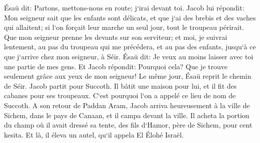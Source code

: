 \verse Ésaü dit: Partons, mettons-nous en route; j`irai devant toi. 
\verse Jacob lui répondit: Mon seigneur sait que les enfants sont délicats, et que j`ai des brebis et des vaches qui allaitent; si l`on forçait leur marche un seul jour, tout le troupeau périrait. 
\verse Que mon seigneur prenne les devants sur son serviteur; et moi, je suivrai lentement, au pas du troupeau qui me précédera, et au pas des enfants, jusqu`à ce que j`arrive chez mon seigneur, à Séir. 
\verse Ésaü dit: Je veux au moins laisser avec toi une partie de mes gens. Et Jacob répondit: Pourquoi cela? Que je trouve seulement grâce aux yeux de mon seigneur! 
\verse Le même jour, Ésaü reprit le chemin de Séir. 
\verse Jacob partit pour Succoth. Il bâtit une maison pour lui, et il fit des cabanes pour ses troupeaux. C`est pourquoi l`on a appelé ce lieu de nom de Succoth. 
\verse A son retour de Paddan Aram, Jacob arriva heureusement à la ville de Sichem, dans le pays de Canaan, et il campa devant la ville. 
\verse Il acheta la portion du champ où il avait dressé sa tente, des fils d`Hamor, père de Sichem, pour cent kesita. 
\verse Et là, il éleva un autel, qu`il appela El Élohé Israël. 

\chapter{}

